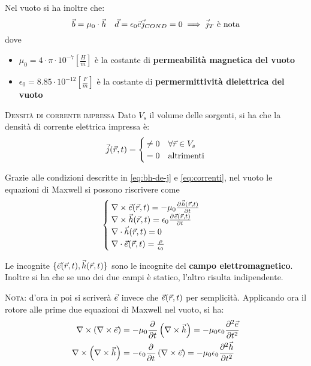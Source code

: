 Nel vuoto si ha inoltre che:
\begin{equation}
  \b = \mu_0 \cdot \h \quad \d = \epsilon_0 \e \\
  \vec{j}_{COND} = 0 \implies \jt \text{ è nota} \\
  \label{eq:bh-de-j}
\end{equation}
dove
\begin{itemize}
  \item $\mu_0 = 4\cdot \pi \cdot 10^{-7} \left[\frac{H}{m}\right]$ è la costante di \textbf{permeabilità
  magnetica del vuoto}
  \item $\epsilon_0 = 8.85 \cdot 10^{-12} \left[\frac{F}{m}\right]$ è la costante di \textbf{permermittività
  dielettrica del vuoto}
\end{itemize}

\textsc{Densità di corrente impressa}
Dato $V_s$ il volume delle sorgenti, si ha che la densità di corrente elettrica impressa è:
\begin{equation} \vec{j}(\r,t)=
  \begin{cases}
    \neq 0 & \forall \r \in V_s \\
    =0 & \text{altrimenti}
  \end{cases}
  \label{eq:correnti}
\end{equation}

Grazie alle condizioni descritte in \eqref{eq:bh-de-j} e \eqref{eq:correnti}, nel vuoto
le equazioni di Maxwell si possono riscrivere come
\begin{equation}\begin{cases}
  \rot \ert = -\mu_0 \deriv{\hrt}{t} \\
  \rot \hrt = \epsilon_0 \deriv{\ert}{t}\\
  \diverg \hrt = 0 \\ \diverg\ert = \frac{\rho}{\epsilon_0}
\end{cases}\label{eq:maxwell-vuoto}\end{equation}

Le incognite $\{\ert, \hrt\}$ sono le incognite del \textbf{campo elettromagnetico}.
Inoltre si ha che se uno dei due campi è statico, l'altro risulta indipendente.

\textsc{Nota:} d'ora in poi si scriverà $\e$ invece che $\ert$ per semplicità.
Applicando ora il rotore alle prime due equazioni di Maxwell nel vuoto, si ha:
\begin{equation}\begin{split}
  \rot\left(\rot\e\right) &= -\mu_0 \deriv{}{t} \left(\rot\h\right) = -\mu_0\epsilon_0 \deriv[2]{\e}{t} \\
  \rot\left(\rot\h\right) &= -\epsilon_0 \deriv{}{t} \left(\rot\e\right) = -\mu_0\epsilon_0 \deriv[2]{\h}{t} \\
\end{split}\end{equation}

